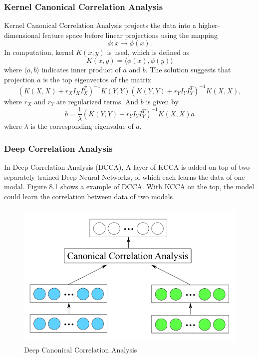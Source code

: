 \documentclass[12pt]{article}
\begin{document}
\subsubsection{Kernel Canonical Correlation Analysis}
Kernel Canonical Correlation Analysis projects the data into a higher-dimensional
feature space before linear projections using the mapping \begin{equation}
\phi\colon x \rightarrow \phi(x).
\end{equation}
In computation, kernel $K(x, y)$ is used, which is defined as\begin{equation}
K(x,y) = \langle \phi (x), \phi (y)\rangle
\end{equation}
where $\langle a, b\rangle$ indicates inner product of $a$ and $b$. The solution suggests that projection $a$ is the top eigenvectos of the matrix\begin{equation}
(K(X,X) + r_XI_XI_X^T)^{-1} K(Y,Y)  (K(Y,Y) + r_YI_YI_Y^T)^{-1} K(X,X),
\end{equation}
where $r_X$ and $r_Y$ are regularized terms.  And $b$ is given by \begin{equation}
b = \frac{1}{\lambda}(K(Y,Y) + r_YI_YI_Y^T)^{-1} K(X,X) a
\end{equation}
where $\lambda$ is the corresponding eigenvalue of $a$. 
\subsubsection{Deep Correlation Analysis}
In Deep Correlation Analysis (DCCA), A layer of KCCA is added on top of two separately trained Deep Neural Networks, of which each learns the data of one modal. Figure 8.1 shows a example of DCCA. With KCCA on the top, the model could learn the correlation between data of two modals.
\begin{figure}[h]
\centering
\includegraphics[height=2.8in]{DCCA.png}
\caption{Deep Canonical Correlation Analysis} \label{fig:side:a}
\end{figure}
\end{document}
